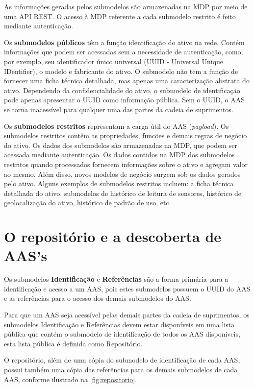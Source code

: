 	As informações geradas pelos submodelos são armazenadas na MDP por meio de uma API REST. O acesso à MDP referente a cada submodelo restrito é feito mediante autenticação.
	
	Os \textbf{submodelos públicos} têm a função identificação do ativo na rede. Contém informações que podem ser acessadas sem a necessidade de autenticação, como, por exemplo, seu identificador único universal (UUID - Universal Unique IDentifier), o modelo e fabricante do ativo. O submodelo não tem a função de fornecer uma ficha técnica detalhada, mas apenas uma caracterização abstrata do ativo. Dependendo da confidencialidade do ativo, o submodelo de identificação pode apenas apresentar o UUID como informação pública. Sem o UUID, o AAS se torna inacessível para qualquer uma das partes da cadeia de suprimentos.
		
	Os \textbf{submodelos restritos} representam a carga útil do AAS (\textit{payload}). Os submodelos restritos contêm as propriedades, funcões e demais regras de negócio do ativo. Os dados dos submodelos são armazenadas na MDP, que podem ser acessada mediante autenticação. Os dados contidos na MDP dos submodelos restritos quando processados fornecem informações sobre o ativo e agregam valor ao mesmo. Além disso, novos modelos de negócio surgem sob os dados gerados pelo ativo. Alguns exemplos de submodelos restritos incluem: a ficha técnica detalhada do ativo, submodelos de histórico de leitura de sensores, histórico de geolocalização do ativo, histórico de padrão de uso, etc.
	
\section{O repositório e a descoberta de AAS's}
	
	Os submodelos \textbf{Identificação} e \textbf{Referências} são a forma primária para a identificação e acesso a um AAS, pois estes submodelos possuem o UUID do AAS e as referências para o acesso dos demais submodelos do AAS.
	
	Para que um AAS seja acessível pelas demais partes da cadeia de suprimentos, os submodelos Identificação e Referências devem estar disponíveis em uma lista pública que contém o submodelo de identificação de todos os AAS disponíveis, esta lista pública é definida como Repositório.
	
	O repositório, além de uma cópia do submodelo de identificação de cada AAS, possui também uma cópia das referências para os demais submodelos de cada AAS, conforme ilustrado na \autoref{fig:repositorio}.
	
